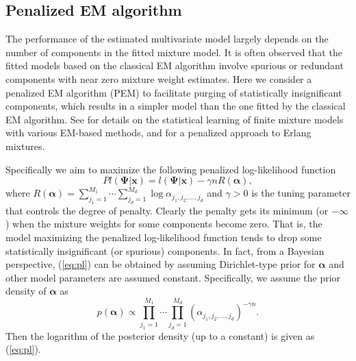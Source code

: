 \documentclass[eng]{csam}
\def\a{\alpha}
\begin{document}
\subsection{Penalized EM algorithm}
The performance of the estimated multivariate model largely depends on the number of components in the fitted mixture model. It is often observed that the fitted models based on the classical EM algorithm involve spurious or redundant components with near zero mixture weight estimates. Here we consider a penalized EM algorithm (PEM) to facilitate purging of statistically insignificant components, which results in a simpler model than the one fitted by the classical EM algorithm. See \citet{Figueiredo} for details on the statistical learning of finite mixture models with various EM-based methods, and \citet{yin2016efficient} for a penalized approach to Erlang mixtures.

Specifically we aim to maximize the following penalized log-likelihood function
\begin{equation}\label{eq:pl}
Pl(\bm{\Psi}|\bm{x}) = l(\bm{\Psi}|\bm{x}) - \gamma n R(\bm{\a}),
\end{equation}
where $R(\bm{\a}) = \sum_{j_1 = 1}^{M_1} \cdots\sum_{j_d = 1}^{M_d}\log \a_{j_1,j_2,\ldots,j_d}$ and $\gamma > 0$ is the tuning parameter that controls the degree of penalty. Clearly the penalty gets its minimum (or $-\infty$) when the mixture weights for some components become zero. That is, the model maximizing the penalized log-likelihood function tends to drop some statistically insignificant (or spurious) components. In fact, from a Bayesian perspective, (\ref{eq:pl}) can be obtained by assuming Dirichlet-type prior for $\bm{\a}$ and other model parameters are assumed constant. Specifically, we assume the prior density of $\bm{\a}$ as
\begin{equation*}
p(\bm{\a}) \propto \prod_{j_1 = 1}^{M_1} \cdots\prod_{j_d = 1}^{M_d}\left(\a_{j_1,j_2,\ldots,j_d}\right)^{-\gamma n }.
\end{equation*}
Then the logarithm of the posterior density (up to a constant) is given as (\ref{eq:pl}).
\end{document}
